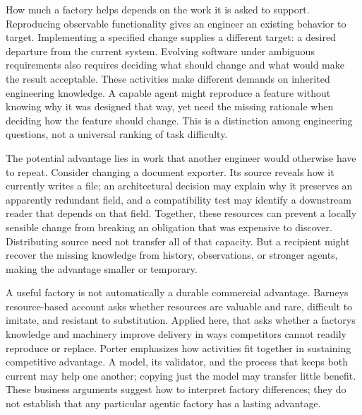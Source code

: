 
How much a factory helps depends on the work it is asked to support. Reproducing observable functionality gives an engineer an existing behavior to target. Implementing a specified change supplies a different target: a desired departure from the current system. Evolving software under ambiguous requirements also requires deciding what should change and what would make the result acceptable. These activities make different demands on inherited engineering knowledge. A capable agent might reproduce a feature without knowing why it was designed that way, yet need the missing rationale when deciding how the feature should change. This is a distinction among engineering questions, not a universal ranking of task difficulty.


The potential advantage lies in work that another engineer would otherwise have to repeat. Consider changing a document exporter. Its source reveals how it currently writes a file; an architectural decision may explain why it preserves an apparently redundant field, and a compatibility test may identify a downstream reader that depends on that field. Together, these resources can prevent a locally sensible change from breaking an obligation that was expensive to discover. Distributing source need not transfer all of that capacity. But a recipient might recover the missing knowledge from history, observations, or stronger agents, making the advantage smaller or temporary.


A useful factory is not automatically a durable commercial advantage. Barney\textquotesingle s resource-based account asks whether resources are valuable and rare, difficult to imitate, and resistant to substitution.\citep{barney1991resources} Applied here, that asks whether a factory\textquotesingle s knowledge and machinery improve delivery in ways competitors cannot readily reproduce or replace. Porter emphasizes how activities fit together in sustaining competitive advantage.\citep{porter1996strategy} A model, its validator, and the process that keeps both current may help one another; copying just the model may transfer little benefit. These business arguments suggest how to interpret factory differences; they do not establish that any particular agentic factory has a lasting advantage.

